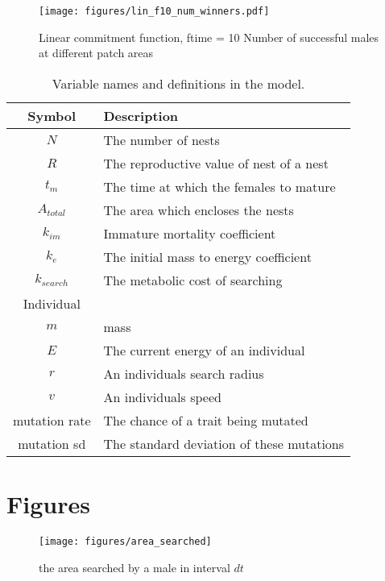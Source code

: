 \documentclass[a4paper,11pt]{article}
\begin{document}
\begin{figure}[h!]
    \centering
    \texttt{[image: figures/lin\_f10\_num\_winners.pdf]}
    \caption{Linear commitment function, ftime = 10 Number of successful males at different patch areas}
    \label{fig:num winners expf10}
\end{figure}


\clearpage
\begin{table}[h!]
    \caption{Variable names and definitions in the model.}
    \centering
    \begin{tabular}{c | l }
        \hline
        Symbol & Description\\
        \hline
        \hline
        $N$ &  The number of nests \\
        $R$ &  The reproductive value of nest of a nest\\
        $t_m$  & The time at which the females to mature\\
        $A_{total}$ & The area which encloses the nests\\
        \hline
        $k_{im}$ & Immature mortality coefficient \\
        $k_e$ & The initial mass to energy coefficient \\
        $k_{search}$ & The metabolic cost of searching \\
        \hline
        Individual & \\
        \hline
        $m$ & mass\\
        $E$ & The current energy of an individual\\
        $r$ & An individuals search radius\\
        $v$ & An individuals speed\\ 
        \hline
        mutation rate & The chance of a trait being mutated\\
        mutation sd & The standard deviation of  these mutations\\
        \hline
    \end{tabular}
\end{table}
    
    
\section{Figures}

\begin{figure}[h!]
\centering
\texttt{[image: figures/area\_searched]}
\caption{the area searched by a male in interval $dt$}
\label{fig:area searched figure}
\end{figure}
\clearpage


\end{document}

